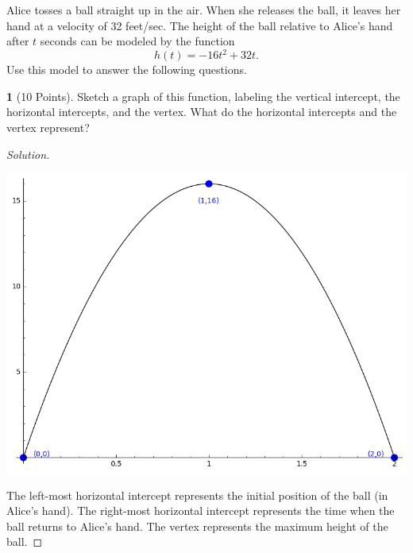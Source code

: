 \documentclass[12pt]{amsart}
\theoremstyle{definition}
\newtheorem{thm}{}
\begin{document}
\noindent Alice tosses a ball straight up in the air.
When she releases the ball, it leaves her hand at a velocity of 32 feet/sec.
The height of the ball relative to Alice's hand after $t$ seconds can be modeled by the function
$$h(t) = -16t^2 + 32t.$$
Use this model to answer the following questions.

\begin{thm}[10 Points]
Sketch a graph of this function, labeling the vertical intercept, the horizontal intercepts, and the vertex.
What do the horizontal intercepts and the vertex represent?
\end{thm}

\begin{proof}[Solution]\hfill\\
  \begin{center}
    \includegraphics[scale = .8]{kinematics}
  \end{center}

  The left-most horizontal intercept represents the initial position of the ball (in Alice's hand).
  The right-most horizontal intercept represents the time when the ball returns to Alice's hand.
  The vertex represents the maximum height of the ball.
\end{proof}
\end{document}
